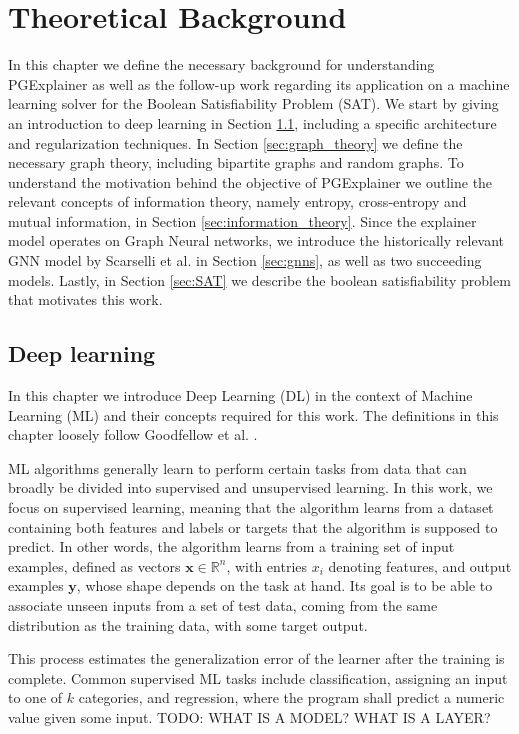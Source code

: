 \chapter{Theoretical Background}
\label{ch:Background}
In this chapter we define the necessary background for understanding PGExplainer as well as the follow-up work regarding its application on a machine learning solver for the Boolean Satisfiability Problem (SAT). We start by giving an introduction to deep learning in Section \ref{sec:deep_learning}, including a specific architecture and regularization techniques. In Section \ref{sec:graph_theory} we define the necessary graph theory, including bipartite graphs and random graphs. To understand the motivation behind the objective of PGExplainer we outline the relevant concepts of information theory, namely entropy, cross-entropy and mutual information, in Section \ref{sec:information_theory}. Since the explainer model operates on Graph Neural networks, we introduce the historically relevant GNN model by Scarselli et al. \cite{4700287} in Section \ref{sec:gnns}, as well as two succeeding models. Lastly, in Section \ref{sec:SAT} we describe the boolean satisfiability problem that motivates this work.

\section{Deep learning}
\label{sec:deep_learning}
In this chapter we introduce Deep Learning (DL) in the context of Machine Learning (ML) and their concepts required for this work. The definitions in this chapter loosely follow Goodfellow et al. \cite{Goodfellow-et-al-2016}.

ML algorithms generally learn to perform certain tasks from data that can broadly be divided into supervised and unsupervised learning. In this work, we focus on supervised learning, meaning that the algorithm learns from a dataset containing both features and labels or targets that the algorithm is supposed to predict. In other words, the algorithm learns from a training set of input examples, defined as vectors $\mathbf{x} \in \mathbb{R}^n$, with entries $x_i$ denoting features, and output examples $\mathbf{y}$, whose shape depends on the task at hand. Its goal is to be able to associate unseen inputs from a set of test data, coming from the same distribution as the training data, with some target output.

This process estimates the generalization error of the learner after the training is complete. 
Common supervised ML tasks include classification, assigning an input to one of $k$ categories, and regression, where the program shall predict a numeric value given some input. 
TODO: WHAT IS A MODEL? WHAT IS A LAYER? \bigskip

